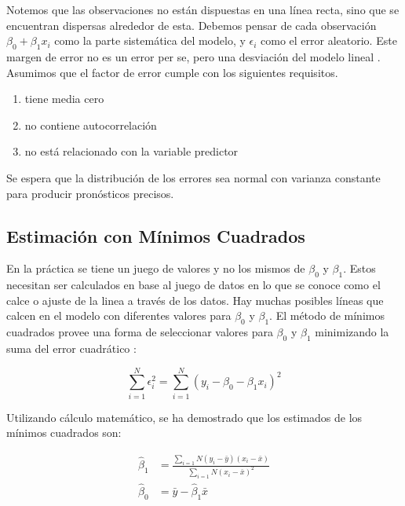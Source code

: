 Notemos que las observaciones no están dispuestas en una línea recta, sino que se encuentran dispersas alrededor de esta. Debemos pensar de cada observación $\beta_{0} + \beta_{1}x_{i}$ como la parte sistemática del modelo, y $\epsilon_i$ como el error aleatorio. Este margen de error no es un error per se, pero una desviación del modelo lineal \cite{hyndman}. Asumimos que el factor de error cumple con los siguientes requisitos.

\begin{enumerate}
  \item tiene media cero
  \item no contiene autocorrelación
  \item no está relacionado con la variable predictor
\end{enumerate}

Se espera que la distribución de los errores sea normal con varianza constante para producir pronósticos precisos.

\subsection{Estimación con Mínimos Cuadrados}
En la práctica se tiene un juego de valores y no los mismos de $\beta_{0}$ y $\beta_{1}$. Estos necesitan ser calculados en base al juego de datos en lo que se conoce como el calce o ajuste de la linea a través de los datos. Hay muchas posibles líneas que calcen en el modelo con diferentes valores para $\beta_{0}$ y $\beta_{1}$. El método de mínimos cuadrados provee una forma de seleccionar valores para $\beta_{0}$ y $\beta_{1}$ minimizando la suma del error cuadrático \cite{estadisticaBasica}:

\begin{equation}
	\sum_{i=1}^{N} \epsilon_{i}^{2} = \sum_{i=1}^{N}(y_{i} - \beta_{0} - \beta_{1}x_{i})^2
\end{equation}

Utilizando cálculo matemático, se ha demostrado que los estimados de los mínimos cuadrados son:

\begin{equation}
\begin{split}
	\hat{\beta}_{1} &= \frac{\sum_{i=1}{N}(y_{i}-\bar{y})(x_{i} - \bar{x})}{\sum_{i=1}{N}(x_{i}-\bar{x})^2}\\
	\hat{\beta}_{0} &= \bar{y} - \hat{\beta}_{1} \bar{x}\\
\end{split}
\end{equation}

